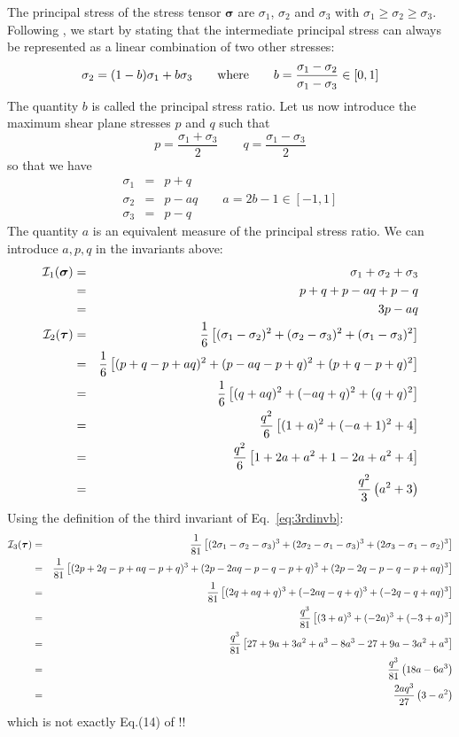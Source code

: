 The principal stress of the stress tensor ${\bm \sigma}$ are $\sigma_1$, $\sigma_2$
and $\sigma_3$ with $\sigma_1 \geq \sigma_2 \geq \sigma_3$.
Following \cite{wojc18}, we start by stating that the intermediate principal 
stress can always be represented as a linear combination of two other stresses:
\begin{equation}
\sigma_2 = (1-b)\sigma_1 + b \sigma_3
\qquad
{\rm where}
\qquad
b = \frac{\sigma_1-\sigma_2}{\sigma_1-\sigma_3}\in [0,1]
\end{equation}
The quantity $b$ is called the principal stress ratio. 
Let us now introduce the maximum shear plane stresses $p$ and $q$ such that 
\begin{equation}
p=\frac{\sigma_1+\sigma_3}{2}
\qquad
q=\frac{\sigma_1-\sigma_3}{2}
\end{equation}
so that we have 
\begin{eqnarray}
\sigma_1 &=& p+q \\
\sigma_2 &=& p-aq \qquad a=2b-1 \in[-1,1] \\
\sigma_3 &=& p-q
\end{eqnarray}
The quantity $a$ is an equivalent measure of the principal stress ratio.
We can introduce $a,p,q$ in the invariants above:
\begin{eqnarray}
{\cal I}_1({\bm \sigma}) 
&=& \sigma_1 + \sigma_2 + \sigma_3 \nonumber\\
&=& p+q + p-aq + p-q \nonumber\\
&=& 3p -aq \\
{\cal I}_2({\bm \tau}) 
&=&\frac{1}{6}\left[(\sigma_{1}-\sigma_{2})^2 +(\sigma_{2}-\sigma_{3})^2 +(\sigma_{1}-\sigma_{3})^2\right]\nonumber\\ 
&=&\frac{1}{6}\left[(p+q-p+aq)^2 +(p-aq-p+q)^2 +(p+q-p+q)^2\right]\nonumber\\ 
&=&\frac{1}{6}\left[(q+aq)^2 +(-aq+q)^2 +(q+q)^2\right]\nonumber\\ 
&=&\frac{q^2}{6}\left[(1+a)^2 +(-a+1)^2 + 4 \right]\nonumber\\ 
&=&\frac{q^2}{6}\left[ 1+2a+a^2 +1 - 2a+a^2 + 4 \right]\nonumber\\ 
&=&\frac{q^2}{3}\left( a^2 +3 \right)
\end{eqnarray}
Using the definition of the third invariant of Eq.~\ref{eq:3rdinvb}:
\begin{eqnarray}
{\cal I}_3({\bm \tau}) 
&=& \frac{1}{81} \left[
(2\sigma_1-\sigma_2-\sigma_3)^3+
(2\sigma_2-\sigma_1-\sigma_3)^3+
(2\sigma_3-\sigma_1-\sigma_2)^3
\right] \nonumber\\
&=& \frac{1}{81} \left[
(2p+2q-p+aq-p+q)^3+
(2p-2aq-p-q-p+q)^3+
(2p-2q-p-q-p+aq)^3
\right] \nonumber\\
&=& \frac{1}{81} \left[ (2q+aq+q)^3+ (-2aq-q+q)^3+ (-2q-q+aq)^3 \right] \nonumber\\
&=& \frac{q^3}{81} \left[ (3+a)^3+ (-2a)^3+ (-3+a)^3 \right] \nonumber\\
&=& \frac{q^3}{81} \left[ 27 +9a + 3a^2 + a^3  -8a^3 -27 +9a -3a^2 + a^3 \right] \nonumber\\
&=& \frac{q^3}{81} \left( 18a  -6 a^3  \right) \nonumber\\
&=& \frac{2a q^3}{27} \left( 3 - a^2  \right) 
\end{eqnarray}
which is not exactly Eq.(14) of \cite{wojc18}!!

